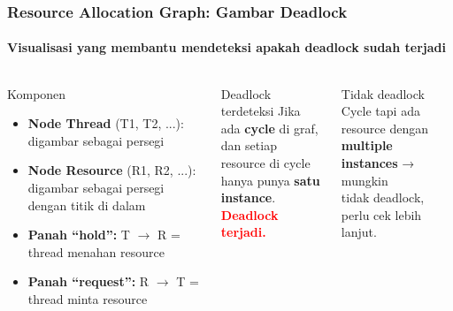 \documentclass[t,aspectratio=169,xcolor=dvipsnames]{beamer}
\newcommand{\tem}[1]{\textbf{\textcolor{red}{#1}}}
\begin{document}
\begin{frame}[shrink=5]
    \frametitle{Resource Allocation Graph: Gambar Deadlock}
    \framesubtitle{Visualisasi yang membantu mendeteksi apakah deadlock sudah terjadi}
    \small

    \begin{columns}[T]
        \begin{block}{Komponen}
            \begin{itemize}
                \item \textbf{Node Thread} (T1, T2, ...): digambar sebagai persegi
                \item \textbf{Node Resource} (R1, R2, ...): digambar sebagai persegi dengan titik di dalam
                \item \textbf{Panah ``hold'':} T $\to$ R = thread menahan resource
                \item \textbf{Panah ``request'': } R $\to$ T = thread minta resource
            \end{itemize}
        \end{block}

        \begin{alertblock}{Deadlock terdeteksi}
            \centering
            Jika ada \textbf{cycle} di graf,\\
            dan setiap resource di cycle\\
            hanya punya \textbf{satu instance}.\\
            \tem{Deadlock terjadi.}
        \end{alertblock}

        \begin{exampleblock}{Tidak deadlock}
            Cycle tapi ada resource dengan\\
            \textbf{multiple instances} → mungkin\\
            tidak deadlock, perlu cek lebih lanjut.
        \end{exampleblock}
    \end{columns}

    \centering
\end{frame}
\end{document}
